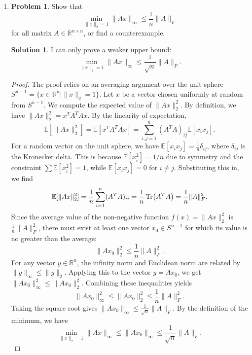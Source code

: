 \documentclass[12pt]{article}
\theoremstyle{definition}
\newtheorem*{solution}{\normalfont\textbf{Solution}}
\newtheorem*{Problem}{\noindent\textbf{Problem}}
\newcommand{\E}{\mathbb{E}}
\begin{document}
\begin{enumerate}[leftmargin=*]
    \item \begin{Problem}
            Show that
            \[
            \min_{\|x\|_2 = 1} \|Ax\|_\infty \leq \frac{1}{n} \|A\|_F
            \]
            for all matrix \( A \in \mathbb{R}^{n \times n} \), or find a counterexample.
        \end{Problem}
        \begin{solution}
            I can only prove a weaker upper bound:
            \[
            \min_{\|x\|_2 = 1} \|Ax\|_{\infty} \leq \frac{1}{\sqrt{n}}\|A\|_F.
            \]
            \begin{proof}
                The proof relies on an averaging argument over the unit sphere \( S^{n-1} = \{x \in \mathbb{R}^n \mid \|x\|_2 = 1\} \). Let \(x\) be a vector chosen uniformly at random from \(S^{n-1}\). We compute the expected value of \( \|Ax\|_2^2 \). By definition, we have \( \|Ax\|_2^2 = x^T A^T A x \). By the linearity of expectation,
                \[
                \E[\|Ax\|_2^2] = \E[x^T A^T A x] = \sum_{i,j=1}^n (A^T A)_{ij} \E[x_i x_j].
                \]
                For a random vector on the unit sphere, we have \( \E[x_i x_j] = \frac{1}{n}\delta_{ij} \), where \( \delta_{ij} \) is the Kronecker delta. This is because \( \E[x_i^2] = 1/n \) due to symmetry and the constraint \( \sum \E[x_i^2] = 1 \), while \( \E[x_i x_j] = 0 \) for \( i \neq j \). Substituting this in, we find
                \[
                \E[\|Ax\|_2^2] = \frac{1}{n} \sum_{i=1}^n (A^T A)_{ii} = \frac{1}{n} \Tr(A^T A) = \frac{1}{n} \|A\|_F^2.
                \]
                Since the average value of the non-negative function \( f(x) = \|Ax\|_2^2 \) is \( \frac{1}{n}\|A\|_F^2 \), there must exist at least one vector \(x_0 \in S^{n-1}\) for which its value is no greater than the average:
                \[
                \|Ax_0\|_2^2 \leq \frac{1}{n}\|A\|_F^2.
                \]
                For any vector \( y \in \mathbb{R}^n \), the infinity norm and Euclidean norm are related by \( \|y\|_\infty \leq \|y\|_2 \). Applying this to the vector \( y = Ax_0 \), we get \( \|Ax_0\|_\infty^2 \leq \|Ax_0\|_2^2 \). Combining these inequalities yields
                \[
                \|Ax_0\|_\infty^2 \leq \|Ax_0\|_2^2 \leq \frac{1}{n}\|A\|_F^2.
                \]
                Taking the square root gives \( \|Ax_0\|_\infty \leq \frac{1}{\sqrt{n}}\|A\|_F \). By the definition of the minimum, we have
                \[
                \min_{\|x\|_2 = 1} \|Ax\|_{\infty} \leq \|Ax_0\|_{\infty} \leq \frac{1}{\sqrt{n}}\|A\|_F.
\]
\end{proof}
\end{solution}
\end{enumerate}
\end{document}
